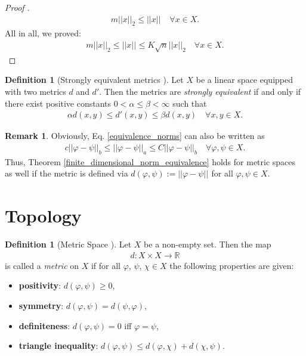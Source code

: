 \documentclass[12pt, a4paper]{article}
\numberwithin{equation}{section}
\theoremstyle{definition}
\theoremstyle{definition}
\newtheorem{defn}[thm]{Definition} %
\newtheorem{remark}[thm]{Remark} %
\newcommand{\norm}[2]{\left\vert\left\vert #1 \right\vert\right\vert_{#2}}
\begin{document}
\begin{proof}[Proof \cite{werner-fa}]
	\begin{align}
		m\norm{x}{2} \leq \norm{x}{} \quad \forall x\in X.
	\end{align}
	All in all, we proved: 
	\begin{align}
		m\norm{x}{2} \leq \norm{x}{} \leq K\sqrt{n}\norm{x}{2} \quad \forall x\in X. 
	\end{align}
	\end{proof} 
	
	\begin{defn}[Strongly equivalent metrics \cite{equivalence-metrics}]\label{defn:strong_equivalence}
		Let $X$ be a linear space equipped with two metrics $d$ and $d'$. Then the metrics are \textit{strongly equivalent} if and only if there exist positive constants $0 < \alpha \leq \beta < \infty$ such that
		\begin{align}
			\alpha d(x, y) \leq d'(x, y) \leq \beta d(x, y) \quad\forall x, y\in X. 
		\end{align}
	\end{defn}
	
	\begin{remark}\label{equivalence_metrics_finite_dimensional}
		Obviously, Eq. \eqref{equivalence_norms} can also be written as 
		\begin{align}
			c\norm{\varphi-\psi}{b} \leq \norm{\varphi-\psi}{a} \leq C\norm{\varphi-\psi}{b} \quad \forall \varphi, \psi\in X. 
		\end{align} 
		Thus, Theorem \ref{finite_dimensional_norm_equivalence} holds for metric spaces as well if the metric is defined via $d(\varphi, \psi) := \norm{\varphi- \psi}{}$ for all $\varphi, \psi\in X$.
	\end{remark}
	
	\newpage 
	\section{Topology}
	\begin{defn}[Metric Space \cite{fa2019}]\label{defn:metric_space}
		Let $X$ be a non-empty set. Then the map 
		\begin{align*}
			d: X\times X\rightarrow \mathbb R
		\end{align*}
		is called a \textit{metric} on $X$ if for all $\varphi$, $\psi$, $\chi\in X$ the following properties are given: 
		\begin{itemize}
			\item \textbf{positivity}: $d(\varphi, \psi) \geq 0$, 
			\item \textbf{symmetry}: $d(\varphi, \psi) = d(\psi, \varphi)$, 
			\item \textbf{definiteness}: $d(\varphi, \psi) = 0$ iff $\varphi = \psi$, 
			\item \textbf{triangle inequality}: $d(\varphi, \psi) \leq d(\varphi, \chi) + d(\chi, \psi)$. 
		\end{itemize}
	\end{defn}
	
\end{document}
